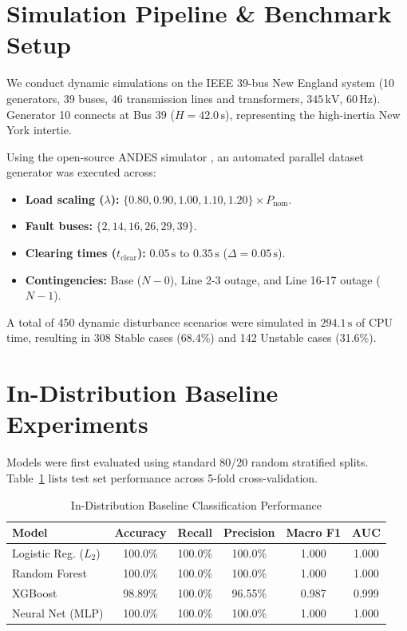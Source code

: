 \documentclass[journal]{IEEEtran}
\begin{document}
\section{Simulation Pipeline \& Benchmark Setup}
We conduct dynamic simulations on the IEEE 39-bus New England system (10 generators, 39 buses, 46 transmission lines and transformers, $345\,\text{kV}$, $60\,\text{Hz}$). Generator 10 connects at Bus 39 ($H = 42.0\,\text{s}$), representing the high-inertia New York intertie. 

Using the open-source ANDES simulator \cite{cui2021andes}, an automated parallel dataset generator was executed across:
\begin{itemize}
    \item \textbf{Load scaling ($\lambda$):} $\{0.80, 0.90, 1.00, 1.10, 1.20\} \times P_{\text{nom}}$.
    \item \textbf{Fault buses:} $\{2, 14, 16, 26, 29, 39\}$.
    \item \textbf{Clearing times ($t_{\text{clear}}$):} $0.05\,\text{s}$ to $0.35\,\text{s}$ ($\Delta = 0.05\,\text{s}$).
    \item \textbf{Contingencies:} Base ($N-0$), Line 2-3 outage, and Line 16-17 outage ($N-1$).
\end{itemize}
A total of 450 dynamic disturbance scenarios were simulated in $294.1\,\text{s}$ of CPU time, resulting in 308 Stable cases (68.4\%) and 142 Unstable cases (31.6\%).

\section{In-Distribution Baseline Experiments}
Models were first evaluated using standard 80/20 random stratified splits. Table~\ref{tab:baselines} lists test set performance across 5-fold cross-validation.

\begin{table}[htbp]
\centering
\caption{In-Distribution Baseline Classification Performance}
\label{tab:baselines}
\setlength{\tabcolsep}{3.5pt}
\begin{tabular}{lccccc}
\toprule
\textbf{Model} & \textbf{Accuracy} & \textbf{Recall} & \textbf{Precision} & \textbf{Macro F1} & \textbf{AUC} \\
\midrule
Logistic Reg. ($L_2$) & 100.0\% & 100.0\% & 100.0\% & 1.000 & 1.000 \\
Random Forest & 100.0\% & 100.0\% & 100.0\% & 1.000 & 1.000 \\
XGBoost & 98.89\% & 100.0\% & 96.55\% & 0.987 & 0.999 \\
Neural Net (MLP) & 100.0\% & 100.0\% & 100.0\% & 1.000 & 1.000 \\
\bottomrule
\end{tabular}
\end{table}
\end{document}

